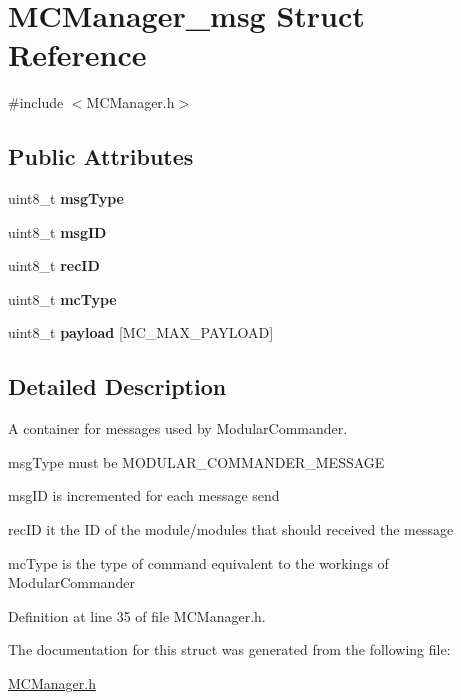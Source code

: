 \hypertarget{structMCManager__msg}{
\section{MCManager\_\-msg Struct Reference}
\label{structMCManager__msg}
}


{\ttfamily \#include $<$MCManager.h$>$}

\subsection*{Public Attributes}
\begin{DoxyCompactItemize}
\item 
\hypertarget{structMCManager__msg_a793f1df791cd797089add8db19ec237c}{
uint8\_\-t {\bfseries msgType}}
\label{structMCManager__msg_a793f1df791cd797089add8db19ec237c}

\item 
\hypertarget{structMCManager__msg_ae96601b2f5c796f078fc75d40f6f3252}{
uint8\_\-t {\bfseries msgID}}
\label{structMCManager__msg_ae96601b2f5c796f078fc75d40f6f3252}

\item 
\hypertarget{structMCManager__msg_a7f5ea83d351a0b7beb5ac1e132895ceb}{
uint8\_\-t {\bfseries recID}}
\label{structMCManager__msg_a7f5ea83d351a0b7beb5ac1e132895ceb}

\item 
\hypertarget{structMCManager__msg_a7675796d23b723400a16d069a9781194}{
uint8\_\-t {\bfseries mcType}}
\label{structMCManager__msg_a7675796d23b723400a16d069a9781194}

\item 
\hypertarget{structMCManager__msg_a0084dd9b9f8c429f13550a8eb3679a92}{
uint8\_\-t {\bfseries payload} \mbox{[}MC\_\-MAX\_\-PAYLOAD\mbox{]}}
\label{structMCManager__msg_a0084dd9b9f8c429f13550a8eb3679a92}

\end{DoxyCompactItemize}


\subsection{Detailed Description}
A container for messages used by ModularCommander.
\begin{DoxyItemize}
\item msgType must be MODULAR\_\-COMMANDER\_\-MESSAGE
\item msgID is incremented for each message send
\item recID it the ID of the module/modules that should received the message
\item mcType is the type of command equivalent to the workings of ModularCommander 
\end{DoxyItemize}

Definition at line 35 of file MCManager.h.



The documentation for this struct was generated from the following file:\begin{DoxyCompactItemize}
\item 
\hyperlink{MCManager_8h}{MCManager.h}\end{DoxyCompactItemize}
